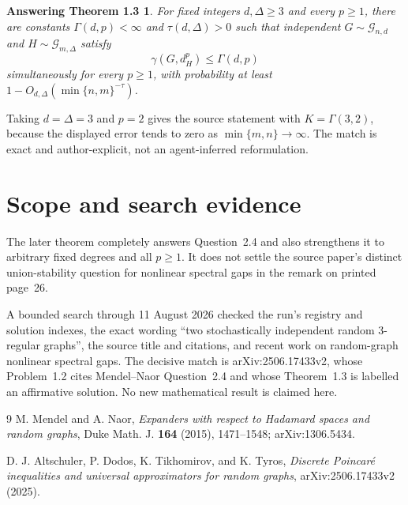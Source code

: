 \documentclass[11pt]{article}
\newtheorem*{answer}{Answering Theorem 1.3}
\begin{document}
\begin{answer}
For fixed integers $d,\Delta\geq3$ and every $p\geq1$, there are constants
$\Gamma(d,p)<\infty$ and $\tau(d,\Delta)>0$ such that independent
$G\sim\mathcal G_{n,d}$ and $H\sim\mathcal G_{m,\Delta}$ satisfy
\[
 \gamma(G,d_H^p)\leq \Gamma(d,p)
\]
simultaneously for every $p\geq1$, with probability at least
$1-O_{d,\Delta}(\min\{n,m\}^{-\tau})$.
\end{answer}

Taking $d=\Delta=3$ and $p=2$ gives the source statement with
$K=\Gamma(3,2)$, because the displayed error tends to zero as
$\min\{m,n\}\to\infty$.  The match is exact and author-explicit, not an
agent-inferred reformulation.

\section{Scope and search evidence}

The later theorem completely answers Question~2.4 and also strengthens it
to arbitrary fixed degrees and all $p\geq1$.  It does not settle the source
paper's distinct union-stability question for nonlinear spectral gaps in the
remark on printed page~26.

A bounded search through 11 August 2026 checked the run's registry and
solution indexes, the exact wording ``two stochastically independent random
3-regular graphs'', the source title and citations, and recent work on
random-graph nonlinear spectral gaps.  The decisive match is
arXiv:2506.17433v2, whose Problem~1.2 cites Mendel--Naor Question~2.4 and
whose Theorem~1.3 is labelled an affirmative solution.  No new mathematical
result is claimed here.

\begin{thebibliography}{9}
M. Mendel and A. Naor,
\emph{Expanders with respect to Hadamard spaces and random graphs},
Duke Math. J. \textbf{164} (2015), 1471--1548;
arXiv:1306.5434.

D. J. Altschuler, P. Dodos, K. Tikhomirov, and K. Tyros,
\emph{Discrete Poincar\'e inequalities and universal approximators for
random graphs}, arXiv:2506.17433v2 (2025).
\end{thebibliography}
\end{document}
